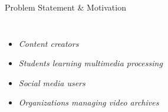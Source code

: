 \documentclass[aspectratio=169,11pt]{beamer}
\newcommand{\placeholder}[1]{\textit{\color{GEUGrey}#1}}
\begin{document}
\begin{frame}{Problem Statement \& Motivation}
\begin{columns}[T,totalwidth=\textwidth]
\begin{itemize}

\setlength{\itemsep}{0pt}

\footnotesize

\item
\placeholder{Content creators}

\item
\placeholder{Students learning multimedia processing}

\item
\placeholder{Social media users}

\item
\placeholder{Organizations managing video archives}

\end{itemize}

\end{columns}

\end{frame}
\end{document}
